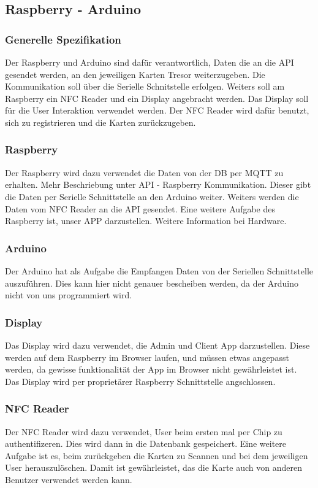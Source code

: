 \documentclass[a4paper]{article}
\begin{document}
\newpage

\subsection{Raspberry - Arduino}
\subsubsection{Generelle Spezifikation}
Der Raspberry und Arduino sind dafür verantwortlich, Daten die an die API gesendet werden, an den jeweiligen Karten Tresor weiterzugeben. Die Kommunikation soll über die Serielle Schnitstelle erfolgen. Weiters soll am Raspberry ein NFC Reader und ein Display angebracht werden. Das Display soll für die User Interaktion verwendet werden. Der NFC Reader wird dafür benutzt, sich zu registrieren und die Karten zurückzugeben.

\subsubsection{Raspberry}
Der Raspberry wird dazu verwendet die Daten von der DB per MQTT zu erhalten. Mehr Beschriebung unter API - Raspberry Kommunikation. Dieser gibt die Daten per Serielle Schnittstelle an den Arduino weiter. Weiters werden die Daten vom NFC Reader an die API gesendet. Eine weitere Aufgabe des Raspberry ist, unser APP darzustellen. Weitere Information bei Hardware.

\subsubsection{Arduino}
Der Arduino hat als Aufgabe die Empfangen Daten von der Seriellen Schnittstelle auszuführen. Dies kann hier nicht genauer bescheiben werden, da der Arduino nicht von uns programmiert wird.

\subsubsection{Display}
Das Display wird dazu verwendet, die Admin und Client App darzustellen. Diese werden auf dem Raspberry im Browser laufen, und müssen etwas angepasst werden, da gewisse funktionalität der App im Browser nicht gewährleistet ist. Das Display wird per proprietärer Raspberry Schnittstelle angschlossen.

\subsubsection{NFC Reader}
Der NFC Reader wird dazu verwendet, User beim ersten mal per Chip zu authentifizeren. Dies wird dann in die Datenbank gespeichert. Eine weitere Aufgabe ist es, beim zurückgeben die Karten zu Scannen und bei dem jeweiligen User herauszulöschen. Damit ist gewährleistet, das die Karte auch von anderen Benutzer verwendet werden kann.
\end{document}
